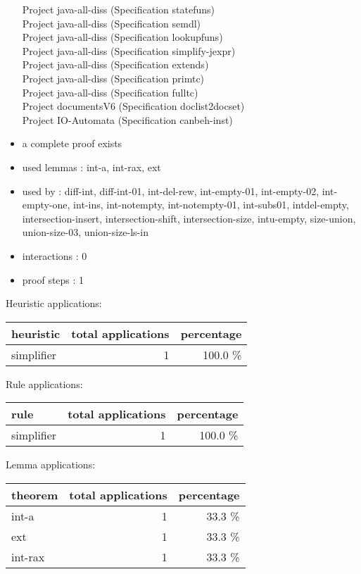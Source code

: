 \documentclass[a4paper]{article}
\begin{document}
\begin{itemize}
Project java-all-diss (Specification statefuns) \\
Project java-all-diss (Specification semdl) \\
Project java-all-diss (Specification lookupfuns) \\
Project java-all-diss (Specification simplify-jexpr) \\
Project java-all-diss (Specification extends) \\
Project java-all-diss (Specification primtc) \\
Project java-all-diss (Specification fulltc) \\
Project documentsV6 (Specification doclist2docset) \\
Project IO-Automata (Specification canbeh-inst)
\item       a complete proof exists
\item       used lemmas  : int-a, int-rax, ext
\item       used by      : diff-int, diff-int-01, int-del-rew, int-empty-01, int-empty-02, int-empty-one, int-ins, int-notempty, int-notempty-01, int-subs01, intdel-empty, intersection-insert, intersection-shift, intersection-size, intu-empty, size-union, union-size-03, union-size-ls-in
\item       interactions : 0
\item       proof steps  : 1
\end{itemize}

\medskip


Heuristic applications:

\begin{supertabular}{l|r|r}
heuristic	& total applications & percentage \\ \hline
simplifier & 1 & 100.0 \% \\

\end{supertabular}

Rule applications:

\begin{supertabular}{l|r|r}
rule	        & total applications & percentage \\ \hline
simplifier & 1 & 100.0 \% \\

\end{supertabular}

Lemma applications:

\begin{supertabular}{l|r|r}
theorem	        & total applications & percentage \\ \hline
int-a & 1 & 33.3 \% \\
ext & 1 & 33.3 \% \\
int-rax & 1 & 33.3 \% \\

\end{supertabular}
\pagebreak
\end{document}
